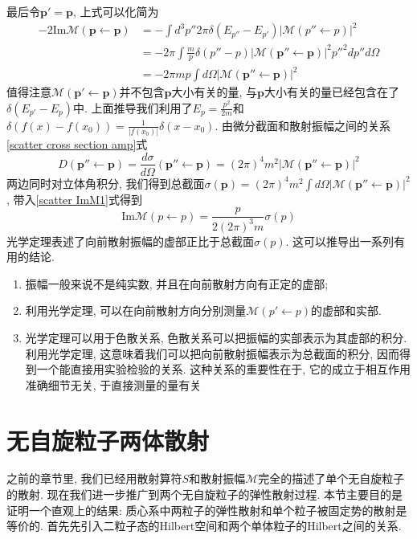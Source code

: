 \documentclass[a4paper,11pt]{book}
\begin{document}
最后令$\mathbf{p}'=\mathbf{p}$, 上式可以化简为
\begin{equation}\label{scatter ImM1}
  \begin{split}
     -2\mathrm{Im}\mathcal{M}(\mathbf{p}\leftarrow \mathbf{p})&=-\int d^3p'' 2\pi\delta(E_{p''}-E_{p'})|\mathcal{M}(p''\leftarrow p)|^2\\
       &=-2\pi\int\frac{m}{p}\delta(p''-p)|\mathcal{M}(\mathbf{p}''\leftarrow \mathbf{p})|^2p''^2dp''d\Omega\\
       &=-2\pi mp\int d\Omega|\mathcal{M}(\mathbf{p}''\leftarrow \mathbf{p})|^2
  \end{split}
\end{equation}
值得注意$\mathcal{M}(\mathbf{p}'\leftarrow\mathbf{p})$并不包含$\mathbf{p}$大小有关的量, 与$\mathbf{p}$大小有关的量已经包含在了$\delta(E_{p'}-E_p)$中. 上面推导我们利用了$E_p=\frac{p^2}{2m}$和$\delta(f(x)-f(x_0))=\frac{1}{|f(x_0)|}\delta(x-x_0)$. 由微分截面和散射振幅之间的关系\eqref{scatter cross section amp}式
\begin{equation*}
  D(\mathbf{p}''\leftarrow \mathbf{p})=\frac{d\sigma}{d\Omega}(\mathbf{p}''\leftarrow \mathbf{p})=(2\pi)^4m^2|\mathcal{M}(\mathbf{p}''\leftarrow \mathbf{p})|^2
\end{equation*}
两边同时对立体角积分, 我们得到总截面$\sigma(\mathbf{p})=(2\pi)^4m^2\int d\Omega|\mathcal{M}(\mathbf{p}''\leftarrow \mathbf{p})|^2$, 带入\eqref{scatter ImM1}式得到
\begin{equation*}
  \mathrm{Im}\mathcal{M}(p\leftarrow p)=\frac{p}{2(2\pi)^3m}\sigma(p)
\end{equation*}
光学定理表述了向前散射振幅的虚部正比于总截面$\sigma(p)$. 这可以推导出一系列有用的结论.
\begin{enumerate}
  \item 振幅一般来说不是纯实数, 并且在向前散射方向有正定的虚部;
  \item 利用光学定理, 可以在向前散射方向分别测量$\mathcal{M}(p'\leftarrow p)$的虚部和实部.
  \item 光学定理可以用于色散关系, 色散关系可以把振幅的实部表示为其虚部的积分. 利用光学定理, 这意味着我们可以把向前散射振幅表示为总截面的积分, 因而得到一个能直接用实验检验的关系. 这种关系的重要性在于, 它的成立于相互作用准确细节无关, 于直接测量的量有关
\end{enumerate}
\section{无自旋粒子两体散射}
之前的章节里, 我们已经用散射算符$S$和散射振幅$\mathcal{M}$完全的描述了单个无自旋粒子的散射. 现在我们进一步推广到两个无自旋粒子的弹性散射过程.
本节主要目的是证明一个直观上的结果: 质心系中两粒子的弹性散射和单个粒子被固定势的散射是等价的. 首先先引入二粒子态的Hilbert空间和两个单体粒子的Hilbert之间的关系.
\end{document}
